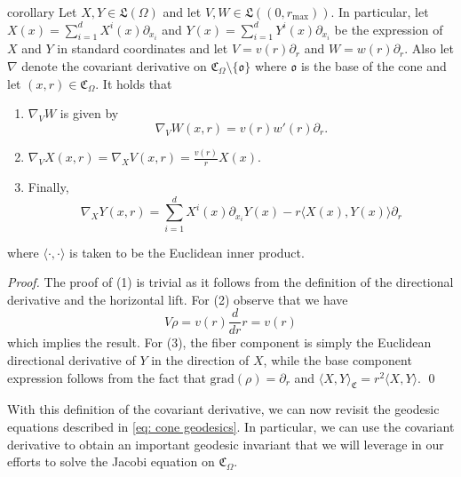 \documentclass{article}
\begin{document}
\begin{restatable}{corollary}{} \label{corollary: connection on cone}
    Let $X, Y \in \mathfrak{L}(\Omega)$ and let $V, W \in \mathfrak{L}((0, r_{\max}))$. In particular, let $X(x) = \sum_{i = 1}^d X^i(x)\partial_{x_i}$ and $Y(x) = \sum_{i = 1}^d Y^i(x)\partial_{x_i}$ be the expression of $X$ and $Y$ in standard coordinates and let $V = v(r)\partial_r$ and $W = w(r)\partial_r$. Also let $\nabla$ denote the covariant derivative on $\mathfrak{C}_\Omega \setminus \{\mathfrak{o}\}$ where $\mathfrak{o}$ is the base of the cone and let $(x,r) \in \mathfrak{C}_\Omega$. It holds that 
    \begin{enumerate}
        \item $\nabla_VW$ is given by 
        \[\nabla_VW(x,r) = v(r)w'(r)\partial_r.\]
        \item $\nabla_VX(x,r) = \nabla_XV(x,r) = \frac{v(r)}{r}X(x)$.
        \item Finally,
        \[\nabla_XY(x,r) = \sum_{i = 1}^dX^i(x) \partial_{x_i}Y(x)  - r\langle X(x), Y(x) \rangle\partial_r \]
    \end{enumerate}
    where $\langle\cdot, \cdot\rangle$ is taken to be the Euclidean inner product. 
\end{restatable}
\noindent \textit{Proof.} The proof of (1) is trivial as it follows from the definition of the directional derivative and the horizontal lift. For (2) observe that we have
\[V\rho = v(r)\frac{d}{d r}r = v(r)\]
which implies the result. For (3), the fiber component is simply the Euclidean directional derivative of $Y$ in the direction of $X$, while the base component expression follows from the fact that $\text{grad}(\rho) = \partial_r$ and $\langle X, Y \rangle_{\mathfrak{C}} = r^2\langle X, Y\rangle$.  \qed{}

With this definition of the covariant derivative, we can now revisit the geodesic equations described in \cref{eq: cone geodesics}. In particular, we can use the covariant derivative to obtain an important geodesic invariant that we will leverage in our efforts to solve the Jacobi equation on $\mathfrak{C}_\Omega$. 
\end{document}
